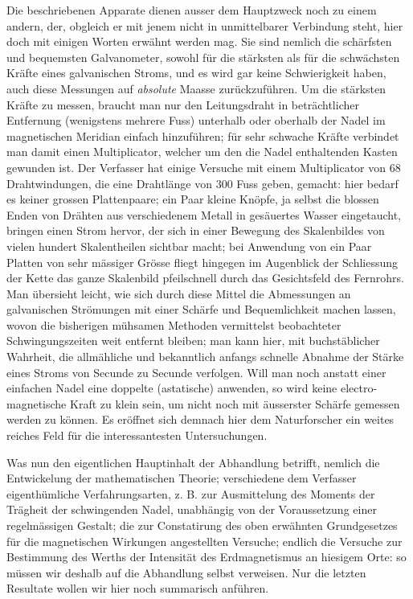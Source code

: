 Die beschriebenen Apparate dienen ausser dem Hauptzweck noch zu
einem andern, der, obgleich er mit jenem nicht in unmittelbarer
Verbindung steht, hier doch mit einigen Worten erwähnt werden
mag. Sie sind nemlich die schärfsten und bequemsten Galvanometer,
sowohl für die stärksten als für die schwächsten Kräfte eines
galvanischen Stroms, und es wird gar keine Schwierigkeit haben,
auch diese Messungen auf \textit{absolute} Maasse zurückzuführen.
Um die stärksten Kräfte zu messen, braucht man nur den Leitungsdraht
in beträchtlicher Entfernung (wenigstens mehrere Fuss) unterhalb
oder oberhalb der
\clearpage
{}
\noindent
Nadel im magnetischen Meridian einfach hinzuführen; für sehr schwache
Kräfte verbindet man damit einen Multiplicator, welcher um den die
Nadel enthaltenden Kasten gewunden ist. Der Verfasser hat einige
Versuche mit einem Multiplicator von 68 Drahtwindungen, die eine
Drahtlänge von 300 Fuss geben, gemacht: hier bedarf es keiner grossen
Plattenpaare; ein Paar kleine Knöpfe, ja selbst die blossen Enden
von Drähten aus verschiedenem Metall in gesäuertes Wasser eingetaucht,
bringen einen Strom hervor, der sich in einer Bewegung des
Skalenbildes von vielen hundert Skalentheilen sichtbar macht;
bei Anwendung von ein Paar Platten von sehr mässiger Grösse
fliegt hingegen im Augenblick der Schliessung der Kette das ganze
Skalenbild pfeilschnell durch das Gesichtsfeld des Fernrohrs.
Man übersieht leicht, wie sich durch diese Mittel die Abmessungen
an galvanischen Strömungen mit einer Schärfe und Bequemlichkeit
machen lassen, wovon die bisherigen mühsamen Methoden vermittelst
beobachteter Schwingungszeiten weit entfernt bleiben; man kann hier,
mit buchstäblicher Wahrheit, die allmähliche und bekanntlich anfangs
schnelle Abnahme der Stärke eines Stroms von Secunde zu Secunde
verfolgen. Will man noch anstatt einer einfachen Nadel eine doppelte
(astatische) anwenden, so wird keine electro-magnetische Kraft zu
klein sein, um nicht noch mit äusserster Schärfe gemessen werden zu
können. Es eröffnet sich demnach hier dem Naturforscher ein weites
reiches Feld für die interessantesten Untersuchungen.

Was nun den eigentlichen Hauptinhalt der Abhandlung betrifft, nemlich
die Entwickelung der mathematischen Theorie; verschiedene dem
Verfasser eigenthümliche Verfahrungsarten, z. B. zur Ausmittelung
des Moments der Trägheit der schwingenden Nadel, unabhängig von
der Voraussetzung einer regelmässigen Gestalt; die zur Constatirung
des oben erwähnten Grundgesetzes für die magnetischen Wirkungen
angestellten Versuche; endlich die Versuche zur Bestimmung des
Werths der Intensität des Erdmagnetismus an hiesigem Orte: so
müssen wir deshalb auf die Abhandlung selbst verweisen. Nur
die letzten Resultate wollen wir hier noch summarisch anführen.

